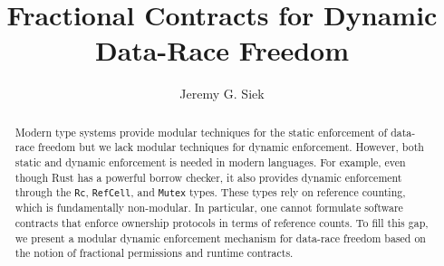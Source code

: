 \documentclass[acmsmall]{acmart}
\begin{document}
\title{Fractional Contracts for Dynamic Data-Race Freedom}

\author{Jeremy G. Siek}



\begin{abstract}
  Modern type systems provide modular techniques for the static
  enforcement of data-race freedom but we lack modular techniques for
  dynamic enforcement. However, both static and dynamic enforcement is
  needed in modern languages. For example, even though Rust has a
  powerful borrow checker, it also provides dynamic enforcement
  through the \texttt{Rc}, \texttt{RefCell}, and \texttt{Mutex} types.
  These types rely on reference counting, which is fundamentally
  non-modular. In particular, one cannot formulate software contracts
  that enforce ownership protocols in terms of reference counts.  To
  fill this gap, we present a modular dynamic enforcement mechanism
  for data-race freedom based on the notion of fractional permissions
  and runtime contracts.
\end{abstract}

\end{document}
